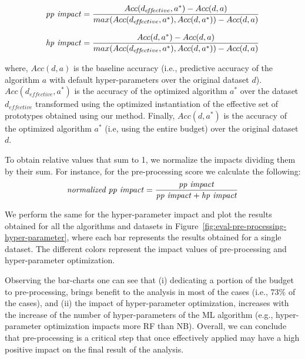 \begin{equation*}
    \text{\textit{pp impact}} = \frac{Acc(d_{e\!f\!f\!ective},a^*) - Acc(d,a)}{max(Acc(d_{e\!f\!f\!ective},a^*),Acc(d,a^*)) - Acc(d,a)}
\end{equation*}

\begin{equation*}
    \text{\textit{hp impact}} = \frac{Acc(d,a^*) - Acc(d,a)}{max(Acc(d_{e\!f\!f\!ective},a^*),Acc(d,a^*)) - Acc(d,a)}
\end{equation*}

where, $Acc(d,a)$ is the baseline accuracy (i.e., predictive accuracy of the algorithm $a$ with default hyper-parameters over the original dataset $d$). $Acc(d_{e\!f\!f\!ective},a^*)$ is the accuracy of the optimized algorithm $a^*$ over the dataset $d_{e\!f\!f\!ective}$ transformed using the optimized instantiation of the effective set of prototypes obtained using our method. Finally,  $Acc(d,a^*)$ is the accuracy of the optimized algorithm $a^*$ (i.e, using the entire budget) over the original dataset $d$.

To obtain relative values that sum to 1, we normalize the impacts dividing them by their sum. For instance, for the pre-processing score we calculate the following:
\begin{equation*}
    \text{\textit{normalized pp impact}} = \frac{\text{\textit{pp impact}}}
    {\text{\textit{pp impact}} + \text{\textit{hp impact}}}
\end{equation*}


We perform the same for the hyper-parameter impact and plot the results obtained for all the algorithms and datasets in Figure~\ref{fig:eval-pre-processing-hyper-parameter}, where each bar represents the results obtained for a single dataset. The different colors represent the impact values of pre-processing and hyper-parameter optimization. 

Observing the bar-charts one can see that (i) dedicating a portion of the budget to pre-processing, brings benefit to the analysis in most of the cases (i.e., $73\%$ of the cases), and (ii) the impact of hyper-parameter optimization, increases with the increase of the number of hyper-parameters of the ML algorithm (e.g., hyper-parameter optimization impacts more RF than NB). Overall, we can conclude that pre-processing is a critical step that once effectively applied may have a high positive impact on the final result of the analysis.


